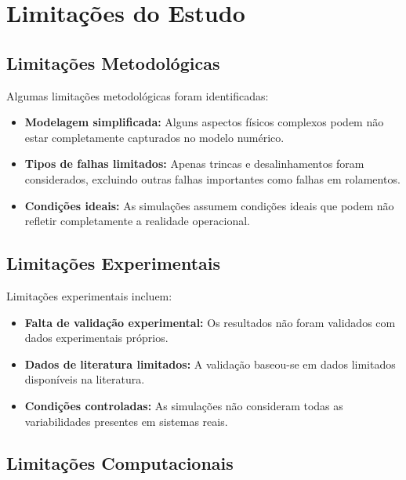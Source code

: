 \section{Limitações do Estudo}

\subsection{Limitações Metodológicas}

Algumas limitações metodológicas foram identificadas:

\begin{itemize}
    \item \textbf{Modelagem simplificada:} Alguns aspectos físicos complexos podem não estar completamente capturados no modelo numérico.
    
    \item \textbf{Tipos de falhas limitados:} Apenas trincas e desalinhamentos foram considerados, excluindo outras falhas importantes como falhas em rolamentos.
    
    \item \textbf{Condições ideais:} As simulações assumem condições ideais que podem não refletir completamente a realidade operacional.
\end{itemize}

\subsection{Limitações Experimentais}

Limitações experimentais incluem:

\begin{itemize}
    \item \textbf{Falta de validação experimental:} Os resultados não foram validados com dados experimentais próprios.
    
    \item \textbf{Dados de literatura limitados:} A validação baseou-se em dados limitados disponíveis na literatura.
    
    \item \textbf{Condições controladas:} As simulações não consideram todas as variabilidades presentes em sistemas reais.
\end{itemize}

\subsection{Limitações Computacionais}

